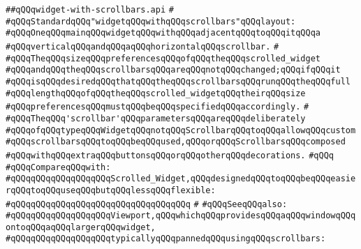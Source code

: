 \label{src/lib/x-kit/widget/old/layout/widget-with-scrollbars.api}
\verb|##qQQqwidget-with-scrollbars.api|\newline
\verb|#|\newline
\verb|#qQQqStandardqQQq"widgetqQQqwithqQQqscrollbars"qQQqlayout:|\newline
\verb|#qQQqOneqQQqmainqQQqwidgetqQQqwithqQQqadjacentqQQqtoqQQqitqQQqa|\newline
\verb|#qQQqverticalqQQqandqQQqaqQQqhorizontalqQQqscrollbar.|\newline
\verb|#|\newline
\verb|#qQQqTheqQQqsizeqQQqpreferencesqQQqofqQQqtheqQQqscrolled_widget|\newline
\verb|#qQQqandqQQqtheqQQqscrollbarsqQQqareqQQqnotqQQqchanged;qQQqifqQQqit|\newline
\verb|#qQQqisqQQqdesiredqQQqthatqQQqtheqQQqscrollbarsqQQqrunqQQqtheqQQqfull|\newline
\verb|#qQQqlengthqQQqofqQQqtheqQQqscrolled_widgetqQQqtheirqQQqsize|\newline
\verb|#qQQqpreferencesqQQqmustqQQqbeqQQqspecifiedqQQqaccordingly.|\newline
\verb|#|\newline
\verb|#qQQqTheqQQq'scrollbar'qQQqparametersqQQqareqQQqdeliberately|\newline
\verb|#qQQqofqQQqtypeqQQqWidgetqQQqnotqQQqScrollbarqQQqtoqQQqallowqQQqcustom|\newline
\verb|#qQQqscrollbarsqQQqtoqQQqbeqQQqused,qQQqorqQQqScrollbarsqQQqcomposed|\newline
\verb|#qQQqwithqQQqextraqQQqbuttonsqQQqorqQQqotherqQQqdecorations.|\newline
\verb|#qQQq|\newline
\verb|#qQQqCompareqQQqwith:|\newline
\verb|#qQQqqQQqqQQqqQQqqQQqScrolled_Widget,qQQqdesignedqQQqtoqQQqbeqQQqeasierqQQqtoqQQquseqQQqbutqQQqlessqQQqflexible:|\newline
\verb|#qQQqqQQqqQQqqQQqqQQqqQQqqQQqqQQqqQQq|\newline
\verb|#|\newline
\verb|#qQQqSeeqQQqalso:|\newline
\verb|#qQQqqQQqqQQqqQQqqQQqViewport,qQQqwhichqQQqprovidesqQQqaqQQqwindowqQQqontoqQQqaqQQqlargerqQQqwidget,|\newline
\verb|#qQQqqQQqqQQqqQQqqQQqtypicallyqQQqpannedqQQqusingqQQqscrollbars:|\newline
